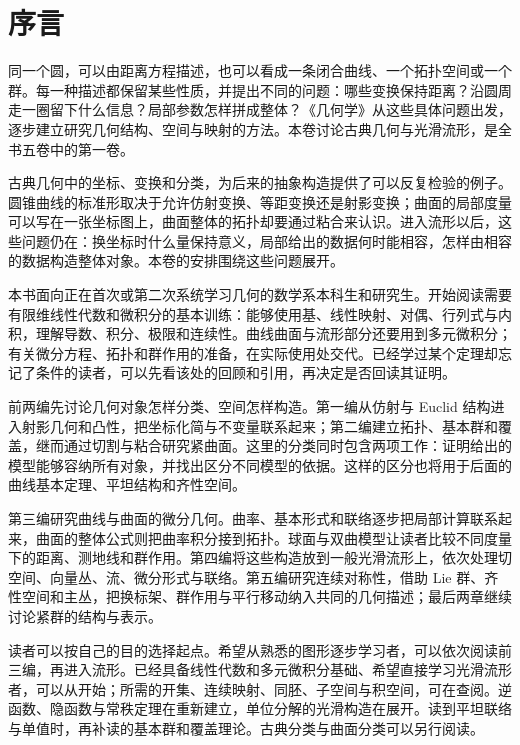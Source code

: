 \chapter*{序言}
同一个圆，可以由距离方程描述，也可以看成一条闭合曲线、一个拓扑空间或一个群。每一种描述都保留某些性质，并提出不同的问题：哪些变换保持距离？沿圆周走一圈留下什么信息？局部参数怎样拼成整体？《几何学》从这些具体问题出发，逐步建立研究几何结构、空间与映射的方法。本卷讨论古典几何与光滑流形，是全书五卷中的第一卷。

\ProseParagraphBreak

古典几何中的坐标、变换和分类，为后来的抽象构造提供了可以反复检验的例子。圆锥曲线的标准形取决于允许仿射变换、等距变换还是射影变换；曲面的局部度量可以写在一张坐标图上，曲面整体的拓扑却要通过粘合来认识。进入流形以后，这些问题仍在：换坐标时什么量保持意义，局部给出的数据何时能相容，怎样由相容的数据构造整体对象。本卷的安排围绕这些问题展开。

\ProseParagraphBreak

本书面向正在首次或第二次系统学习几何的数学系本科生和研究生。开始阅读需要有限维线性代数和微积分的基本训练：能够使用基、线性映射、对偶、行列式与内积，理解导数、积分、极限和连续性。曲线曲面与流形部分还要用到多元微积分；有关微分方程、拓扑和群作用的准备，在实际使用处交代。已经学过某个定理却忘记了条件的读者，可以先看该处的回顾和引用，再决定是否回读其证明。

\ProseParagraphBreak

前两编先讨论几何对象怎样分类、空间怎样构造。第一编从仿射与 Euclid 结构进入射影几何和凸性，把坐标化简与不变量联系起来；第二编建立拓扑、基本群和覆盖，继而通过切割与粘合研究紧曲面。这里的分类同时包含两项工作：证明给出的模型能够容纳所有对象，并找出区分不同模型的依据。这样的区分也将用于后面的曲线基本定理、平坦结构和齐性空间。

\ProseParagraphBreak

第三编研究曲线与曲面的微分几何。曲率、基本形式和联络逐步把局部计算联系起来，曲面的整体公式则把曲率积分接到拓扑。球面与双曲模型让读者比较不同度量下的距离、测地线和群作用。第四编将这些构造放到一般光滑流形上，依次处理切空间、向量丛、流、微分形式与联络。第五编研究连续对称性，借助 Lie 群、齐性空间和主丛，把换标架、群作用与平行移动纳入共同的几何描述；最后两章继续讨论紧群的结构与表示。

\ProseParagraphBreak

读者可以按自己的目的选择起点。希望从熟悉的图形逐步学习者，可以依次阅读前三编，再进入流形。已经具备线性代数和多元微积分基础、希望直接学习光滑流形者，可以从开始；所需的开集、连续映射、同胚、子空间与积空间，可在查阅。逆函数、隐函数与常秩定理在重新建立，单位分解的光滑构造在展开。读到平坦联络与单值时，再补读的基本群和覆盖理论。古典分类与曲面分类可以另行阅读。

